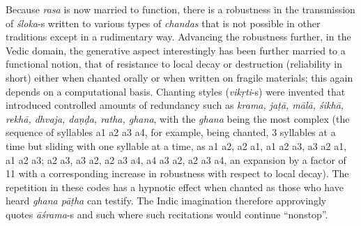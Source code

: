 Because \textsl{rasa} is now married to function, there is a robustness in the transmission of \textsl{śloka}-s written to various types of \textsl{chandas} that is not possible in other traditions except in a rudimentary way. Advancing the robustness further, in the Vedic domain, the generative aspect interestingly has been further married to a functional notion, that of resistance to local decay or destruction (reliability in short) either when chanted orally or when written on fragile materials; this again depends on a computational basis. Chanting styles (\textsl{vikṛti}-s) were invented that introduced controlled amounts of redundancy such as \textsl{krama, jaṭā, mālā, śikhā, rekhā, dhvaja, daṇḍa, ratha, ghana}, with the \textsl{ghana} being the most complex (the sequence of syllables a1 a2 a3 a4, for example, being chanted, 3 syllables at a time but sliding with one syllable at a time, as a1 a2, a2 a1, a1 a2 a3, a3 a2 a1, a1 a2 a3; a2 a3, a3 a2, a2 a3 a4, a4 a3 a2, a2 a3 a4, an expansion by a factor of 11 with a corresponding increase in robustness with respect to local decay). The repetition in these codes has a hypnotic effect when chanted as those who have heard \textsl{ghana pāṭha} can testify. The Indic imagination therefore approvingly quotes \textsl{āśrama}-s and such where such recitations would continue “nonstop”.

